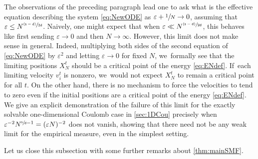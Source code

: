 \documentclass[10pt]{amsart}
\newcommand{\psfrac}[2]{\sfrac{(#1)}{#2}}
\theoremstyle{plain}
\theoremstyle{definition}
\let\vep\varepsilon
\let\ux X
\renewcommand{\d}{\mathsf{d}}
\newcommand{\s}{\mathsf{s}}
\begin{document}
The observations of the preceding paragraph lead one to ask what is the effective equation describing the system \eqref{eq:NewODE} as $\vep+\sfrac{1}{N}\to 0$, assuming that $\vep \leq N^{\psfrac{\s-\d}{2\d}}$. Naively, one might expect that when $\vep \ll N^{\psfrac{\s-\d}{2\d}}$, this behaves like first sending $\vep\to 0$ and then $N\to\infty$. However, this limit does not make sense in general. Indeed, multiplying both sides of the second equation of \eqref{eq:NewODE} by $\vep^2$ and letting $\vep\to 0$ for fixed $N$, we~formally see that the limiting positions $\ux_{N}^t$ should be a critical point of the energy \eqref{eq:ENdef}. If~each limiting velocity $v_{i}^t$ is nonzero, we~would not expect $\ux_{N}^t$ to remain a critical point for all $t$. On the other hand, there is no mechanism to force the velocities to tend to zero even if the initial positions are a critical point of the energy \eqref{eq:ENdef}. We give an explicit demonstration of the failure of this limit for the exactly solvable one-dimensional Coulomb case in \cref{sec:1DCou} precisely when $\vep^{-2}N^{\sfrac{\s}{\d}-1} = (\vep N)^{-2}$ does not vanish, showing that there need not be any weak limit for the empirical measure, even in the simplest setting.

Let us close this subsection with some further remarks about \cref{thm:mainSMF}.
\end{document}
